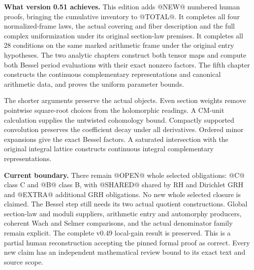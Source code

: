 \textbf{What version 0.51 achieves.}
This edition adds @NEW@ numbered human proofs, bringing the cumulative
inventory to @TOTAL@. It completes all four normalized-frame laws, the
actual covering and fiber description and the full complex uniformization
under its original section-law premises. It completes all 28 conditions
on the same marked arithmetic frame under the original entry hypotheses.
The two analytic chapters construct both tensor maps and compute both
Bessel period evaluations with their exact nonzero factors. The fifth
chapter constructs the continuous complementary representations and
canonical arithmetic data, and proves the uniform parameter bounds.

The shorter arguments preserve the actual objects. Even section weights
remove pointwise square-root choices from the holomorphic readings.
A CM-unit calculation supplies the untwisted cohomology bound.
Compactly supported convolution preserves the coefficient decay under
all derivatives. Ordered minor expansions give the exact Bessel factors.
A saturated intersection with the original integral lattice constructs
continuous integral complementary representations.

\textbf{Current boundary.}
There remain @OPEN@ whole selected obligations: @C@ class C and @B@
class B, with @SHARED@ shared by RH and Dirichlet GRH and @EXTRA@
additional GRH obligations. No new whole selected closure is claimed.
The Bessel step still needs its two actual quotient constructions.
Global section-law and moduli suppliers, arithmetic entry and automorphy
producers, coherent Wach and Selmer comparisons, and the actual
denominator family remain explicit. The complete v0.49 local-gain result
is preserved. This is a partial human reconstruction accepting the
pinned formal proof as correct. Every new claim has an independent
mathematical review bound to its exact text and source scope.

